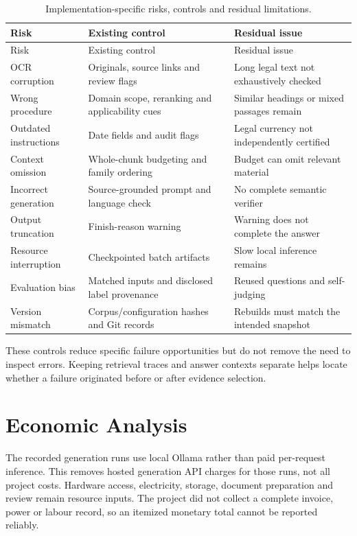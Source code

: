 \begin{longtable}{p{32mm}p{48mm}p{54mm}}
\caption{Implementation-specific risks, controls and residual limitations.}\label{tab:risks}\\\toprule
Risk & Existing control & Residual issue\\\midrule\endfirsthead
\toprule Risk & Existing control & Residual issue\\\midrule\endhead
OCR corruption & Originals, source links and review flags & Long legal text not exhaustively checked\\
Wrong procedure & Domain scope, reranking and applicability cues & Similar headings or mixed passages remain\\
Outdated instructions & Date fields and audit flags & Legal currency not independently certified\\
Context omission & Whole-chunk budgeting and family ordering & Budget can omit relevant material\\
Incorrect generation & Source-grounded prompt and language check & No complete semantic verifier\\
Output truncation & Finish-reason warning & Warning does not complete the answer\\
Resource interruption & Checkpointed batch artifacts & Slow local inference remains\\
Evaluation bias & Matched inputs and disclosed label provenance & Reused questions and self-judging\\
Version mismatch & Corpus/configuration hashes and Git records & Rebuilds must match the intended snapshot\\\bottomrule
\end{longtable}
These controls reduce specific failure opportunities but do not remove the need to inspect errors. Keeping retrieval traces and answer contexts separate helps locate whether a failure originated before or after evidence selection.

\section{Economic Analysis}
The recorded generation runs use local Ollama rather than paid per-request inference. This removes hosted generation API charges for those runs, not all project costs. Hardware access, electricity, storage, document preparation and review remain resource inputs. The project did not collect a complete invoice, power or labour record, so an itemized monetary total cannot be reported reliably.

